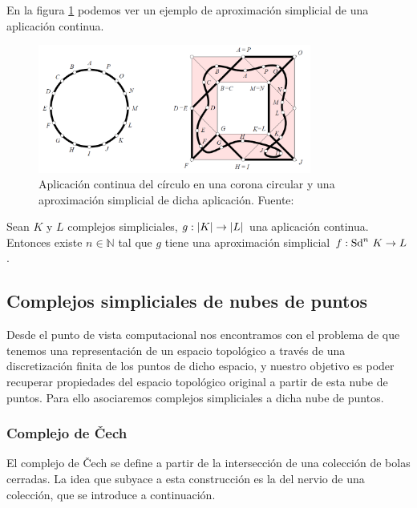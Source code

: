En la figura \ref{ref:aproxSimp} podemos ver un ejemplo de aproximación simplicial de una aplicación continua.

\begin{figure}[!ht]
\centering
\includegraphics[width=0.8\textwidth]{include/figuras/aproximacionSimplicial.png} 
\caption{Aplicación continua del círculo en una corona circular y una aproximación simplicial de dicha aplicación. Fuente: \cite{libroEH}}
\label{ref:aproxSimp}
\end{figure}

\begin{theorem}
\label{ref:teoremaAproximacionSimplicial}
\begin{sloppypar}
Sean $K$ y $L$ complejos simpliciales, ${g: \lvert K\rvert \to \lvert L\rvert}$ una aplicación continua. Entonces existe $n \in \mathbb{N}$ tal que $g$ tiene una aproximación simplicial ${f: \text{\rm Sd}^{n}\ K \to L}$.
\end{sloppypar}
\end{theorem}

\subsection{Complejos simpliciales de nubes de puntos}
Desde el punto de vista computacional nos encontramos con el problema de que tenemos una representación de un espacio topológico a través de una discretización finita de los puntos de dicho espacio, y nuestro objetivo es poder recuperar propiedades del espacio topológico original a partir de esta nube de puntos. Para ello asociaremos complejos simpliciales a dicha nube de puntos.

\subsubsection*{Complejo de \v{C}ech}
El complejo de \v{C}ech se define a partir de la intersección de una colección de bolas cerradas. La idea que subyace a esta construcción es la del nervio de una colección, que se introduce a continuación.

